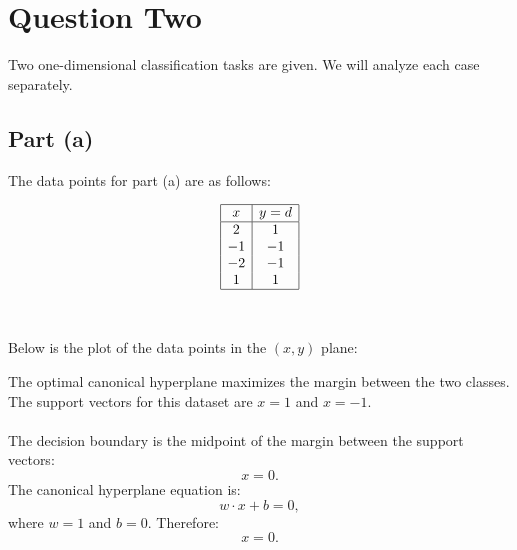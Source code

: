 \documentclass[a4paper, 11pt]{article}
\begin{document}
	\newpage
	\section{Question Two}
	
	
	Two one-dimensional classification tasks are given. We will analyze each case separately.
	
	\subsection*{Part (a)}
	The data points for part (a) are as follows:
	
	\[
	\begin{array}{|c|c|}
		\hline
		x & y = d \\
		\hline
		2 & 1 \\
		-1 & -1 \\
		-2 & -1 \\
		1 & 1 \\
		\hline
	\end{array}
	\]\\\\
	Below is the plot of the data points in the $(x, y)$ plane:
	
	\begin{center}
	\end{center}
	The optimal canonical hyperplane maximizes the margin between the two classes. The support vectors for this dataset are $x = 1$ and $x = -1$.\\\\
	The decision boundary is the midpoint of the margin between the support vectors:
	\[
	x = 0.
	\]
	The canonical hyperplane equation is:
	\[
	w \cdot x + b = 0,
	\]
	where $w = 1$ and $b = 0$. Therefore:
	\[
	x = 0.
	\]
	
\end{document}
